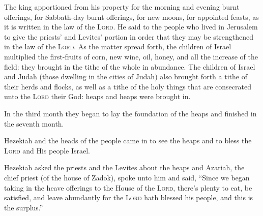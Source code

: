 \begin{inparaenum}
   The king apportioned from his property for the morning and evening burnt offerings, for Sabbath-day burnt offerings, for new moons, for appointed feasts, as it is written in the law of the \textsc{Lord}.%
   He said to the people who lived in Jerusalem to give the priests' and Levites' portion in order that they may be strengthened in the law of the \textsc{Lord}.%
   As the matter spread forth, the children of Israel multiplied the first-fruits of corn, new wine, oil, honey, and all the increase of the field: they brought in the tithe of the whole in abundance.%
   The children of Israel and Judah (those dwelling in the cities of Judah) also brought forth a tithe of their herds and flocks, as well as a tithe of the holy things that are consecrated unto the \textsc{Lord} their God: heaps and heaps were brought in.%
  
   In the third month they began to lay the foundation of the heaps and finished in the seventh month.%
  
   Hezekiah and the heads of the people came in to see the heaps and to bless the \textsc{Lord} and His people Israel.%
  
   Hezekiah asked the priests and the Levites about the heaps%
   and Azariah, the chief priest (of the house of Zadok), spoke unto him and said, ``Since we began taking in the heave offerings to the House of the \textsc{Lord}, there's plenty to eat, be satisfied, and leave abundantly for the \textsc{Lord} hath blessed his people, and this is the surplus.''%
  

\end{inparaenum}
